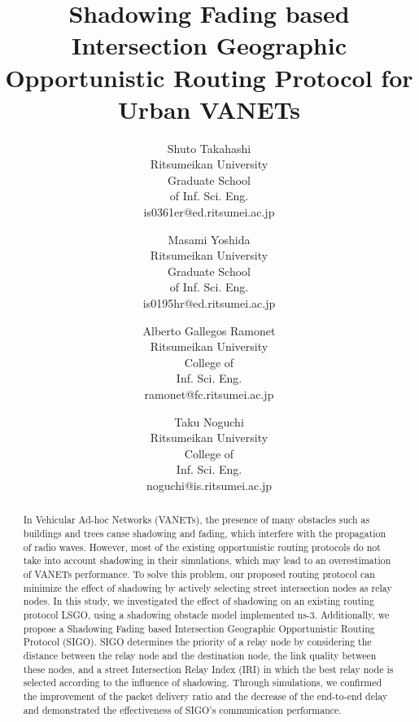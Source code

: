 \documentclass[conference]{IEEEtran}
\begin{document}
\title{Shadowing Fading based Intersection Geographic Opportunistic Routing Protocol for Urban VANETs
}

\author{
    Shuto Takahashi\\
    Ritsumeikan University\\
    Graduate School\\
    of Inf. Sci. Eng.\\
    is0361er@ed.ritsumei.ac.jp
  \and
    Masami Yoshida\\
    Ritsumeikan University\\
    Graduate School\\
    of Inf. Sci. Eng.\\
    is0195hr@ed.ritsumei.ac.jp
    \and
    Alberto Gallegos Ramonet\\
    Ritsumeikan University\\
    College of\\
    Inf. Sci. Eng.\\
    ramonet@fc.ritsumei.ac.jp
    \and
    Taku Noguchi\\
    Ritsumeikan University\\
    College of\\
    Inf. Sci. Eng.\\
    noguchi@is.ritsumei.ac.jp
}


\maketitle

\begin{abstract}

In Vehicular Ad-hoc Networks (VANETs), the presence of many obstacles such as buildings and trees cause shadowing and fading, which interfere with the propagation of radio waves.  However, most of the existing opportunistic routing protocols do not take into account shadowing in  their simulations, which may lead to an overestimation of VANETs performance. 
To solve this problem, our proposed routing protocol can minimize the effect of shadowing by actively selecting street intersection nodes as relay nodes. In this study, we investigated the effect of shadowing on an existing routing protocol LSGO, using a shadowing obstacle model implemented ns-3.
Additionally, we propose a Shadowing Fading  based Intersection Geographic Opportunistic Routing Protocol (SIGO). 
SIGO determines the priority of a relay node by considering the distance between the relay node and the destination node, the link quality between these nodes, and a street Intersection Relay Index (IRI) in which the best relay node is selected according to the influence of shadowing.
Through simulations, we confirmed the improvement of the packet delivery ratio and the decrease of the end-to-end delay and demonstrated the effectiveness of SIGO's communication performance.
\end{abstract}
\end{document}
